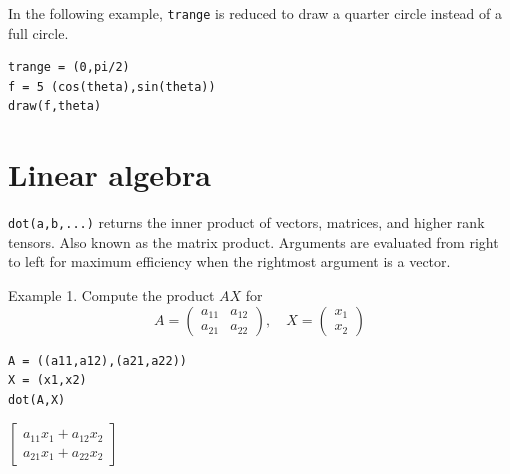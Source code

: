\documentclass[12pt]{article}
\begin{document}
In the following example, \verb$trange$ is reduced
to draw a quarter circle instead of a full circle.

{\color{blue}
\begin{verbatim}
trange = (0,pi/2)
f = 5 (cos(theta),sin(theta))
draw(f,theta)
\end{verbatim}}

\begin{center}
\end{center}

\newpage

\section{Linear algebra}

\verb$dot(a,b,...)$ returns the inner product of vectors, matrices,
and higher rank tensors.
Also known as the matrix product.
Arguments are evaluated from right to left
for maximum efficiency when the rightmost argument is a vector.

\bigskip

Example 1. Compute the product $AX$ for
\begin{equation*}
A=\begin{pmatrix}a_{11}&a_{12}\\a_{21}&a_{22}\end{pmatrix},
\quad
X=\begin{pmatrix}x_1\\x_2\end{pmatrix}
\end{equation*}

{\color{blue}
\begin{verbatim}
A = ((a11,a12),(a21,a22))
X = (x1,x2)
dot(A,X)
\end{verbatim}
}

$\displaystyle
\begin{bmatrix}
a_{11}x_1+a_{12}x_2
\\[1ex]
a_{21}x_1+a_{22}x_2
\end{bmatrix}
$
\end{document}
